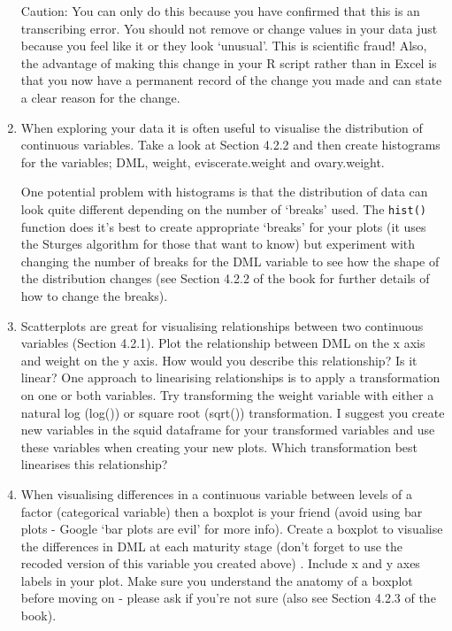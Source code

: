 \documentclass[12pt]{article}
\newcommand{\lst}[1]{\lstinline{#1}}
\begin{document}
\begin{enumerate}
Caution: You can only do this because you have confirmed that this is an transcribing error. You should not remove or change values in your data just because you feel like it or they look ‘unusual’. This is scientific fraud! Also, the advantage of making this change in your R script rather than in Excel is that you now have a permanent record of the change you made and can state a clear reason for the change.

 \item When exploring your data it is often useful to visualise the distribution of continuous variables. Take a look at Section 4.2.2 and then create histograms for the variables; DML, weight, eviscerate.weight and ovary.weight. 
 
One potential problem with histograms is that the distribution of data can look quite different depending on the number of ‘breaks’ used. The \lst{hist()} function does it’s best to create appropriate ‘breaks’ for your plots (it uses the Sturges algorithm for those that want to know) but experiment with changing the number of breaks for the DML variable to see how the shape of the distribution changes (see Section 4.2.2 of the book for further details of how to change the breaks).

 
\item Scatterplots are great for visualising relationships between two continuous variables (Section 4.2.1). Plot the relationship between DML on the x axis and weight on the y axis. How would you describe this relationship? Is it linear? One approach to linearising relationships is to apply a transformation on one or both variables. Try transforming the weight variable with either a natural log (log()) or square root (sqrt()) transformation. I suggest you create new variables in the squid dataframe for your transformed variables and use these variables when creating your new plots. Which transformation best linearises this relationship? 

 
\item When visualising differences in a continuous variable between levels of a factor (categorical variable) then a boxplot is your friend (avoid using bar plots - Google ‘bar plots are evil’ for more info). Create a boxplot to visualise the differences in DML at each maturity stage (don’t forget to use the recoded version of this variable you created above) . Include x and y axes labels in your plot. Make sure you understand the anatomy of a boxplot before moving on - please ask if you’re not sure (also see Section 4.2.3 of the book). 


\end{enumerate}
\end{document}
